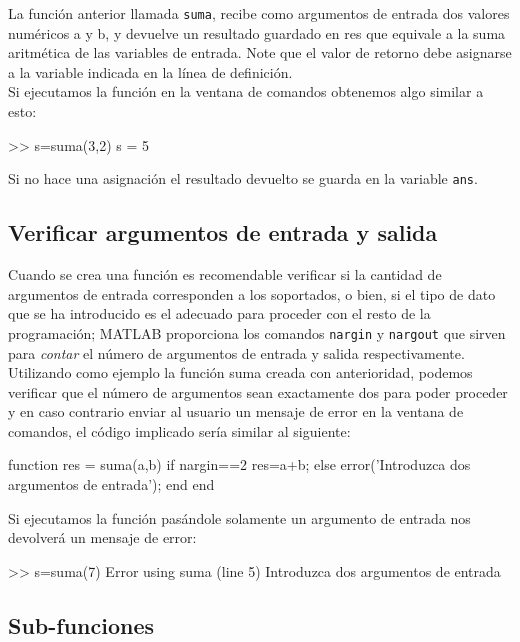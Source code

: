 La función anterior llamada \texttt{suma}, recibe como argumentos de
entrada dos valores numéricos a y b, y devuelve un resultado guardado en
res que equivale a la suma aritmética de las variables de entrada. Note
que el valor de retorno debe asignarse a la variable indicada en la
línea de definición.\\

Si ejecutamos la función en la ventana de comandos obtenemos algo
similar a esto:

\begin{matlab}
>> s=suma(3,2)
s =
     5
\end{matlab}

Si no hace una asignación el resultado devuelto se guarda en la variable
\texttt{ans}.

\subsection{Verificar argumentos de entrada y salida}\label{verificar-argumentos-de-entrada-y-salida}

Cuando se crea una función es recomendable verificar si la cantidad de
argumentos de entrada corresponden a los soportados, o bien, si el tipo
de dato que se ha introducido es el adecuado para proceder con el resto
de la programación; MATLAB proporciona los comandos \texttt{nargin} y
\texttt{nargout} que sirven para \emph{contar} el número de argumentos
de entrada y salida respectivamente. \\

Utilizando como ejemplo la función suma creada con anterioridad, podemos
verificar que el número de argumentos sean exactamente dos para poder
proceder y en caso contrario enviar al usuario un mensaje de error en la
ventana de comandos, el código implicado sería similar al siguiente:

\begin{matlab}
function res = suma(a,b)
if nargin==2
    res=a+b;
else
    error('Introduzca dos argumentos de entrada');
end
end
\end{matlab}

Si ejecutamos la función pasándole solamente un argumento de entrada nos
devolverá un mensaje de error:

\begin{matlab}
>> s=suma(7)
Error using suma (line 5)
Introduzca dos argumentos de entrada
\end{matlab}

\subsection{Sub-funciones}\label{sub-funciones}

